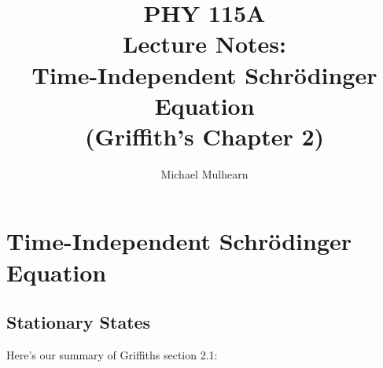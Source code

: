\documentclass[12pt]{book}
\begin{document}
\newcommand{\ihbar}{\ensuremath{i \hbar}}
\newcommand{\Pss}{\ensuremath{\Psi^*}}
\newcommand{\dPsidt}{\ensuremath{ \frac{\partial \Psi}{\partial t} }}
\newcommand{\dPsidx}{\ensuremath{ \frac{\partial \Psi}{\partial x} }}
\newcommand{\ddPsidx}{\ensuremath{ \frac{\partial^2 \Psi}{\partial x^2} }}
\newcommand{\dPssdt}{\ensuremath{ \frac{\partial \Psi^*}{\partial t} }}
\newcommand{\dPssdx}{\ensuremath{ \frac{\partial \Psi^*}{\partial x} }}
\newcommand{\ddPssdx}{\ensuremath{ \frac{\partial^2 \Psi^*}{\partial x^2} }}

\newcommand{\dphidt}{\ensuremath{ \frac{d \phi}{dt} }}
\newcommand{\dpsidx}{\ensuremath{ \frac{d \psi}{dx} }}
\newcommand{\ddpsidx}{\ensuremath{ \frac{d^2 \psi}{dx^2} }}


\title{PHY 115A \\ Lecture Notes: \\ 
Time-Independent Schr\"odinger Equation \\
(Griffith's Chapter 2)}
\author{Michael Mulhearn}

\maketitle

\setcounter{chapter}{1}
\chapter{Time-Independent Schr\"odinger Equation}

\section{Stationary States}

Here's our summary of Griffiths section 2.1:
\end{document}
